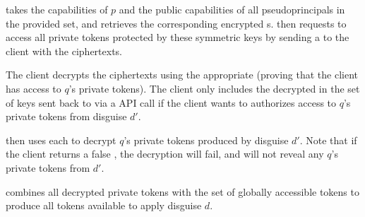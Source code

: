 \sys takes the capabilities of $p$ and the public capabilities of all pseudoprincipals in the
provided set, and retrieves the corresponding encrypted \symk{}s.
\sys then requests to access all private tokens protected by these symmetric keys by sending a
 to the client with the \symk{} ciphertexts.

The client decrypts the ciphertexts using the appropriate  (proving
that the client has access to $q$'s private tokens). 
%
The client only includes the decrypted  in the set of keys sent back to \sys via a
 API call if the client wants to authorizes access to $q$'s private tokens
from disguise $d'$. 

\sys then uses each  to decrypt $q$'s private tokens produced by disguise $d'$. Note that
if the client returns a false , the decryption will fail, and \sys will not reveal any
$q$'s private tokens from $d'$.

\sys combines all decrypted private tokens with the set of globally accessible tokens to produce
all tokens available to apply disguise $d$. 


